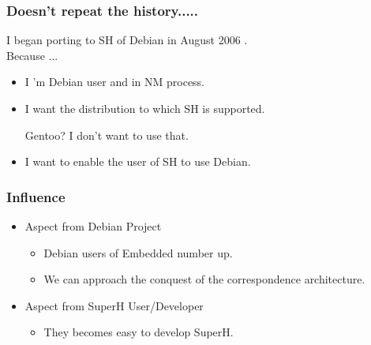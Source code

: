 \documentclass[cjk,dvipdfmx,12pt]{beamer}
\begin{document}
\begin{frame}
 \frametitle{Doesn't repeat the history.....}

  I began porting to SH of Debian in August 2006 .\\
  Because ...
  \begin{itemize}
    \item I 'm Debian user and in NM process.
    \item I want the distribution to which SH is supported.

	Gentoo? I don't want to use that.
    \item I want to enable the user of SH to use Debian.
  \end{itemize}
\end{frame}



\begin{frame}
 \frametitle{Influence}
    \begin{itemize}
	\item Aspect from Debian Project
	 \begin{itemize}
	  \item Debian users of Embedded number up.
	  \item We can approach the conquest of the 
		correspondence architecture.%
 
	 \end{itemize} 
	\item Aspect from SuperH User/Developer
	 \begin{itemize}
	  \item They becomes easy to develop SuperH. 
	 \end{itemize}
  \end{itemize}
\end{frame}


%	
%
%
\end{document}
